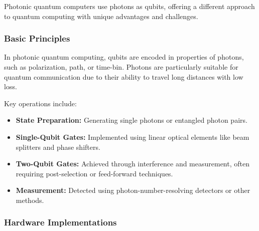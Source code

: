 Photonic quantum computers use photons as qubits, offering a different
approach to quantum computing with unique advantages and challenges.

\subsubsection*{Basic Principles}

In photonic quantum computing, qubits are encoded in properties of photons,
such as polarization, path, or time-bin. Photons are particularly suitable
for quantum communication due to their ability to travel long distances with
low loss.

\vspace{0.3cm}

\noindent
Key operations include:

\begin{itemize}
  \item \textbf{State Preparation:} Generating single photons or entangled
    photon pairs.
  \item \textbf{Single-Qubit Gates:} Implemented using linear optical
    elements like beam splitters and phase shifters.
  \item \textbf{Two-Qubit Gates:} Achieved through interference and
    measurement, often requiring post-selection or feed-forward techniques.
  \item \textbf{Measurement:} Detected using photon-number-resolving
    detectors or other methods.
\end{itemize}

\vspace{0.3cm}


\subsubsection*{Hardware Implementations}

